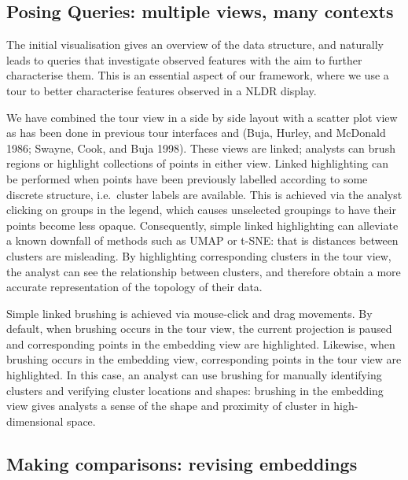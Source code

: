 \documentclass[article,notitle]{jdssv}
\begin{document}
\hypertarget{posing-queries-multiple-views-many-contexts}{%
\subsection{Posing Queries: multiple views, many contexts}\label{posing-queries-multiple-views-many-contexts}}

The initial visualisation gives an overview of the data structure,
and naturally leads to queries that investigate observed features with
the aim to further characterise them. This is an essential aspect of
our framework, where we use a tour to better characterise
features observed in a NLDR display.

We have combined the tour view in a side by side layout with a scatter plot
view as has been done in previous tour interfaces  and 
(Buja, Hurley, and McDonald 1986; Swayne, Cook, and Buja 1998). These views are
linked; analysts can brush regions or highlight collections of points in either
view. Linked highlighting can be performed when points have been previously
labelled according to some discrete structure, i.e.~cluster labels are
available. This is achieved via the analyst clicking on groups in the legend,
which causes unselected groupings to have their points become less opaque.
Consequently, simple linked highlighting can alleviate a known downfall of
methods such as UMAP or t-SNE: that is distances between clusters are
misleading. By highlighting corresponding clusters in the tour view, the
analyst can see the relationship between clusters, and therefore obtain a more
accurate representation of the topology of their data.

Simple linked brushing is achieved via mouse-click and drag movements. By
default, when brushing occurs in the tour view, the current projection is
paused and corresponding points in the embedding view are highlighted.
Likewise, when brushing occurs in the embedding view, corresponding points in
the tour view are highlighted. In this case, an analyst can use brushing for
manually identifying clusters and verifying cluster locations and shapes:
brushing in the embedding view gives analysts a sense of the shape and
proximity of cluster in high-dimensional space.

\hypertarget{making-comparisons-revising-embeddings}{%
\subsection{Making comparisons: revising embeddings}\label{making-comparisons-revising-embeddings}}
\end{document}
